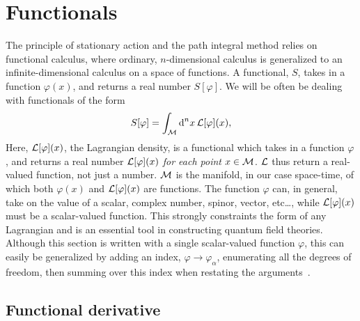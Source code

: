 \section{Functionals}
\label{appendix: Functional derivatives}


The principle of stationary action and the path integral method relies on functional calculus, where ordinary, $n$-dimensional calculus is generalized to an infinite-dimensional calculus on a space of functions.
A functional, $S$, takes in a function $\varphi(x)$, and returns a real number $S[\varphi]$.
We will be often be dealing with functionals of the form
%
\begin{equation}
    \label{general action functional}
    S[\varphi] = \int_{\mathcal{M}} \text{d}^n x \, \mathcal{L}[\varphi](x),
\end{equation}
%
Here, $\mathcal{L}[\varphi](x)$, the Lagrangian density, is a functional which takes in a function $\varphi$, and returns a real number $\mathcal{L}[\varphi](x)$ \emph{for each point} $x \in \mathcal{M}$.
$\mathcal{L}$ thus return a real-valued function, not just a number.
$\mathcal{M}$ is the manifold, in our case space-time, of which both $\varphi(x)$ and $\mathcal{L}[\varphi](x)$ are functions.
The function $\varphi$ can, in general, take on the value of a scalar, complex number, spinor, vector, etc\dots, while $\mathcal{L}[\varphi](x)$ must be a scalar-valued function.
This strongly constraints the form of any Lagrangian and is an essential tool in constructing quantum field theories.
Although this section is written with a single scalar-valued function $\varphi$, this can easily be generalized by adding an index, $\varphi \rightarrow \varphi_\alpha$, enumerating all the degrees of freedom, then summing over this index when restating the arguments~\autocite{carrollSpacetimeGeometryIntroduction2019,schwartzQuantumFieldTheory2013,peskinIntroductionQuantumField1995}.



\subsection{Functional derivative}

